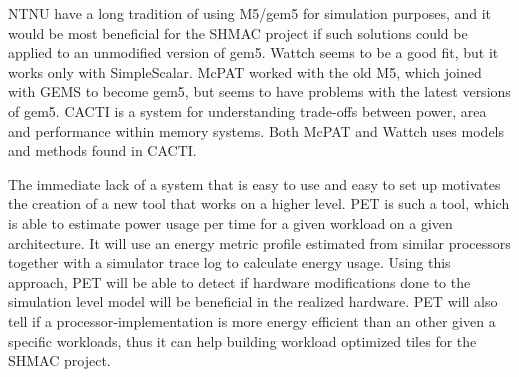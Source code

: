 NTNU have a long tradition of using M5/gem5 for simulation purposes, and it
would be most beneficial for the SHMAC project if such solutions could be
applied to an unmodified version of gem5. Wattch seems to be a good fit, but it
works only with SimpleScalar\cite{wattchanalysis}. McPAT worked with the old
M5\cite{m5mcpatparser}, which joined with GEMS to become gem5\cite{gem5hipeac},
but seems to have problems with the latest versions of
gem5\cite{mcpatgem5problems}. CACTI is a system for understanding trade-offs
between power, area and performance within memory
systems\cite{hpcacti,muralimanohar2010memory}. Both McPAT and Wattch uses
models and methods found in CACTI\cite{li2009mcpat}.

The immediate lack of a system that is easy to use and easy to set up motivates
the creation of a new tool that works on a higher level. PET is such a tool,
which is able to estimate power usage per time for a given workload on a given
architecture.  It will use an energy metric profile estimated from similar
processors together with a simulator trace log to calculate energy usage.
Using this approach, PET will be able to detect if hardware modifications done
to the simulation level model will be beneficial in the realized hardware. PET
will also tell if a processor-implementation is more energy efficient than an
other given a specific workloads, thus it can help building workload optimized tiles
for the SHMAC project\cite{shmacwebpage}.



